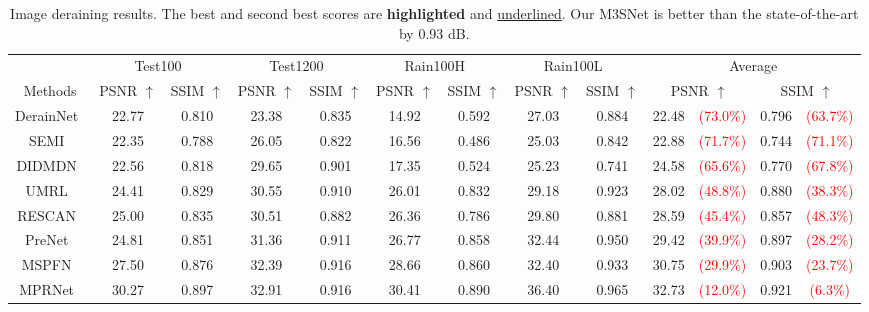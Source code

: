 \documentclass[sn-mathphys,Numbered]{sn-jnl}
\theoremstyle{thmstyleone}\newtheorem{theorem}{Theorem}\newtheorem{proposition}[theorem]{Proposition}
\theoremstyle{thmstyletwo}\newtheorem{example}{Example}\newtheorem{remark}{Remark}
\theoremstyle{thmstylethree}\newtheorem{definition}{Definition}
\begin{document}
\begin{sidewaystable}
\caption{Image deraining results. The best and second best scores are \textbf{highlighted} and \underline{underlined}. Our M3SNet is better than the state-of-the-art by 0.93 dB. }\label{tb:01}
\begin{tabular}{ccccccccc||cccc}
    \hline
    \multicolumn{1}{c}{} & \multicolumn{2}{c}{Test100~\cite{Test100}}  & \multicolumn{2}{c}{Test1200~\cite{MSPFN}} & \multicolumn{2}{c}{Rain100H~\cite{Rain100}} & \multicolumn{2}{c||}{Rain100L~\cite{Rain100}} & \multicolumn{4}{c}{Average} 
    \\
   Methods &PSNR $\uparrow$ &  SSIM $\uparrow$  & PSNR $\uparrow$ & SSIM $\uparrow$ &PSNR $\uparrow$ &SSIM $\uparrow$ & PSNR $\uparrow$&SSIM $\uparrow$ & \multicolumn{2}{c}{PSNR $\uparrow$} & \multicolumn{2}{c}{SSIM $\uparrow$}
    \\
    \hline\hline
    DerainNet~\cite{DerainNet}  & 22.77 & 0.810  & 23.38  & 0.835  & 14.92 &  0.592  & 27.03 & 0.884 & 22.48 & \textcolor{red}{(73.0\%)} & 0.796 & \textcolor{red}{(63.7\%)}
    \\
     SEMI~\cite{semi}  & 22.35  & 0.788  & 26.05 & 0.822  & 16.56 &  0.486 & 25.03 & 0.842 & 22.88 & \textcolor{red}{(71.7\%)} & 0.744 &\textcolor{red}{(71.1\%)}
     \\
    DIDMDN~\cite{DIDMDN} & 22.56 & 0.818  & 29.65 & 0.901  & 17.35 &  0.524 &25.23 & 0.741 & 24.58 & \textcolor{red}{(65.6\%)} & 0.770&\textcolor{red}{(67.8\%)}
     \\
    UMRL~\cite{UMRL}  & 24.41 &0.829 & 30.55 &  0.910   & 26.01 & 0.832 & 29.18 & 0.923& 28.02 & \textcolor{red}{(48.8\%)} & 0.880 & \textcolor{red}{(38.3\%)}
       \\
    RESCAN~\cite{RESCAN}  & 25.00 & 0.835 & 30.51 & 0.882  &26.36 & 0.786 & 29.80 &0.881 & 28.59 &\textcolor{red}{(45.4\%)} & 0.857&\textcolor{red}{(48.3\%)}
       \\
     PreNet~\cite{PREnet}  & 24.81 &0.851 & 31.36&  0.911   & 26.77 & 0.858  &32.44 & 0.950 &29.42 & \textcolor{red}{(39.9\%)} & 0.897 &\textcolor{red}{(28.2\%)}
    \\
   MSPFN~\cite{MSPFN}  & 27.50 & 0.876 & 32.39 &  0.916   & 28.66 & 0.860  & 32.40 & 0.933 & 30.75 &\textcolor{red}{(29.9\%)} & 0.903&\textcolor{red}{(23.7\%)}
       \\
     MPRNet~\cite{Zamir2021MPRNet}  & 30.27 & 0.897 & 32.91 &  0.916   & 30.41 & 0.890  & 36.40 & 0.965 & 32.73 &\textcolor{red}{(12.0\%)} & 0.921&\textcolor{red}{(6.3\%)}
       \\

\end{tabular}
\end{sidewaystable}
\end{document}

